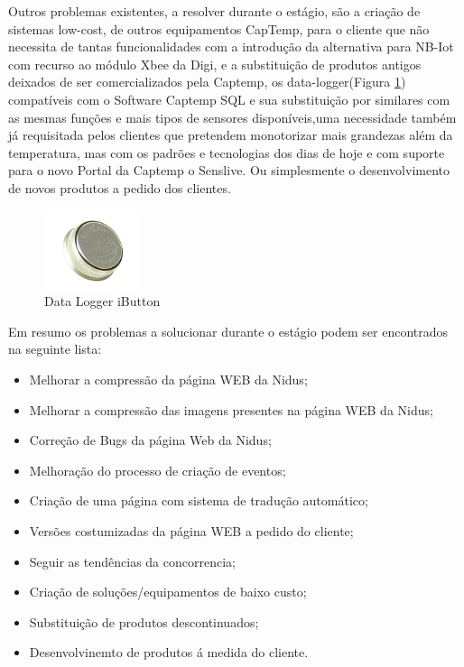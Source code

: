 Outros problemas existentes, a resolver durante o estágio, são a criação de sistemas low-cost, de outros equipamentos CapTemp, para o cliente que não necessita de tantas funcionalidades com a introdução da alternativa para NB-Iot com recurso ao módulo Xbee da Digi, e a substituição de produtos antigos deixados de ser comercializados pela Captemp, os data-logger(Figura \ref{ds1921}) compatíveis com o Software Captemp SQL e sua substituição por similares com as mesmas funções e mais tipos de sensores disponíveis,uma necessidade também já requisitada pelos clientes que pretendem monotorizar mais grandezas além da temperatura, mas com os padrões e tecnologias dos dias de hoje e com suporte para o novo Portal da Captemp o Senslive. Ou simplesmente o desenvolvimento de novos produtos a pedido dos clientes.
\begin{figure}[htb]
  \centering
  \includegraphics[width=0.25\textwidth]{images/ds1921.jpg}
  \caption{Data Logger iButton}\label{ds1921}
\end{figure}
\par
Em resumo os problemas a solucionar durante o estágio podem ser encontrados na seguinte lista:
\begin{itemize}
\item Melhorar a compressão da página WEB da Nidus;
\item Melhorar a compressão das imagens presentes na página WEB da Nidus;
\item Correção de Bugs da página Web da Nidus;
\item Melhoração do processo de criação de eventos;
\item Criação de uma página com sistema de tradução automático;
\item Versões costumizadas da página WEB a pedido do cliente;
\item Seguir as tendências da concorrencia;
\item Criação de soluções/equipamentos de baixo custo;
\item Substituição de produtos descontinuados;
\item Desenvolvinemto de produtos á medida do cliente.
\end{itemize}

